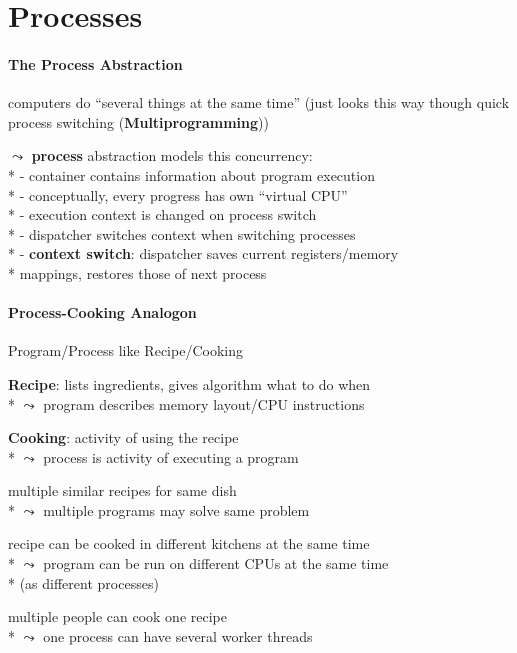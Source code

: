 \section{Processes}

\paragraph{The Process Abstraction}
\begin{items}
	\item computers do "`several things at the same time"' (just looks this way though quick process switching (\textbf{Multiprogramming}))
	\item \( \leadsto \) \textbf{process} abstraction models this concurrency: \\*
		- container contains information about program execution \\*
		- conceptually, every progress has own "`virtual CPU"' \\*
		- execution context is changed on process switch \\*
		- dispatcher switches context when switching processes \\*
		- \textbf{context switch}: dispatcher saves current registers/memory \\* \phantom{-} mappings, restores those of next process
\end{items}

\paragraph{Process-Cooking Analogon}
\begin{items}
	\item Program/Process like Recipe/Cooking
	\item \textbf{Recipe}: lists ingredients, gives algorithm what to do when \\*
		\( \leadsto \) program describes memory layout/CPU instructions
	\item \textbf{Cooking}: activity of using the recipe \\*
		\( \leadsto \) process is activity of executing a program
	\item multiple similar recipes for same dish \\*
		\( \leadsto \) multiple programs may solve same problem
	\item recipe can be cooked in different kitchens at the same time \\*
		\( \leadsto \) program can be run on different CPUs at the same time \\* \phantom{\( \leadsto \)} (as different processes)
	\item multiple people can cook one recipe \\*
		\( \leadsto \) one process can have several worker threads
\end{items}

